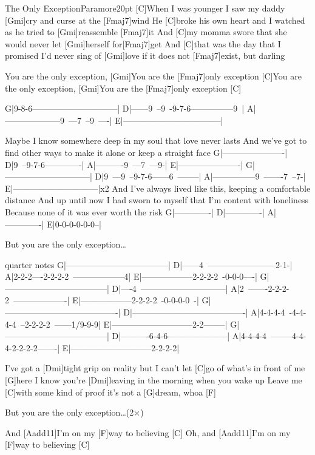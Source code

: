 \begin{song}{The Only Exception}{Paramore}{20pt}
%
[C]When I was younger I saw my daddy [Gmi]cry and curse at the [Fmaj7]wind
He [C]broke his own heart and I watched as he tried to [Gmi]reassemble [Fmaj7]it
And [C]my momma swore that she would never let [Gmi]herself for[Fmaj7]get
And [C]that was the day that I promised I'd never sing of [Gmi]love
if it does not [Fmaj7]exist, but darling

\chorus%
[C]You are the only exception, [Gmi]You are the [Fmaj7]only exception
[C]You are the only exception, [Gmi]You are the [Fmaj7]only exception [C]{}

\tabs
G|9-8-6------------------------------|
D|------9~--9~-9-7-6---------------9~|
A|--------------------9~---7~--9~----|
E|-----------------------------------|
\endtabs

%
Maybe I know somewhere deep in my soul that love never lasts
And we've got to find other ways to make it alone or keep a straight face
\tabs
G|----------------------|
D|9~--9-7-6-------------|
A|----------9~---7~---9-|
E|----------------------|
\endtabs
\tabs
G|------------------------------|
D|9~---9~--9-7-6------6~--------|
A|---------------9~-------7~--7-|
E|------------------------------|x2
\endtabs
And I've always lived like this, keeping a comfortable distance
And up until now I had sworn to myself that I'm content with loneliness
Because none of it was ever worth the risk
\tabs
G|-------------|
D|-------------|
A|-------------|
E|0-0-0-0-0-0--|
\endtabs

\chorus But you are the only exception\dots

\tabs
quarter notes
G|------------------------------------|
D|------4~------------------------2-1-|
A|2-2-2----2-2-2-2~------------------4|
E|------------------2-2-2-2~-0-0-0----|
\endtabs
\tabs
G|------------------------------------|
D|----4~------------------------------|
A|2~-------2-2-2-2~-------------------|
E|------------------2-2-2-2~-0-0-0-0~-|
\endtabs
\tabs
G|----------------------------------------|
D|----------------------------------------|
A|4-4-4-4~-4-4-4-4~--2-2-2-2~------1/9-9-9|
E|-----------------------------2-2--------|
\endtabs
\tabs
G|------------------------------------|
D|----------6-4-6---------------------|
A|4-4-4-4~--------4-4-4-2-2-2-2-------|
E|-----------------------------2-2-2-2|
\endtabs

\verse{*}%
I've got a [Dmi]tight grip on reality but I can't 
let [C]go of what's in front of me [G]here
I know you're [Dmi]leaving in the morning when you wake up
Leave me [C]with some kind of proof it's not a [G]dream, whoa [F]{}

\chorus But you are the only exception\dots (2$\times$)

\verse{*}%
And [Aadd11]I'm on my [F]way to believing [C]{}
Oh, and [Aadd11]I'm on my [F]way to believing [C]{}
\end{song}
